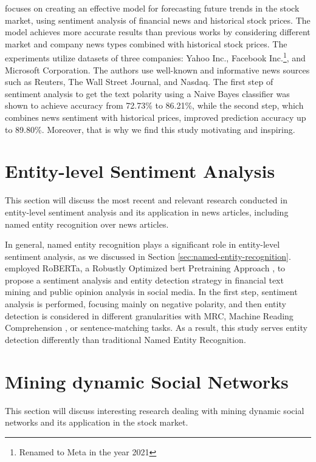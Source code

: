 \textcite{khedr2017predicting} focuses on creating an effective model for forecasting future trends in the stock market, using sentiment analysis of financial news and historical stock prices. The model achieves more accurate results than previous works by considering different market and company news types combined with historical stock prices. The experiments utilize datasets of three companies: Yahoo Inc., Facebook Inc.\footnote{Renamed to Meta in the year 2021}, and Microsoft Corporation. The authors use well-known and informative news sources such as Reuters, The Wall Street Journal, and Nasdaq. The first step of sentiment analysis to get the text polarity using a Naive Bayes classifier was shown to achieve accuracy from 72.73\% to 86.21\%, while the second step, which combines news sentiment with historical prices, improved prediction accuracy up to 89.80\%. Moreover, that is why we find this study motivating and inspiring.

\section{Entity-level Sentiment Analysis}
\label{sec:entity-level-sentiment-analysis}
This section will discuss the most recent and relevant research conducted in entity-level sentiment analysis and its application in news articles, including named entity recognition over news articles.

In general, named entity recognition plays a significant role in entity-level sentiment analysis, as we discussed in Section \ref{sec:named-entity-recognition}. \cite{zhao2021bert} employed RoBERTa, a Robustly Optimized \acrshort{bert} Pretraining Approach \parencite{liu2019roberta}, to propose a sentiment analysis and entity detection strategy in financial text mining and public opinion analysis in social media. In the first step, sentiment analysis is performed, focusing mainly on negative polarity, and then entity detection is considered in different granularities with MRC, Machine Reading Comprehension \parencite{liu2019mrc}, or sentence-matching tasks. As a result, this study serves entity detection differently than traditional Named Entity Recognition.

\section{Mining dynamic Social Networks}
\label{sec:mining-dynamic-social-networks}
This section will discuss interesting research \cite{Jin2012} dealing with mining dynamic social networks and its application in the stock market. 

